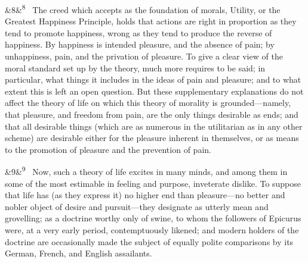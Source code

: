 \documentclass[12pt]{article}
\newcommand{\para}[1][]{\par\noindent\ifx&#1&\else\textsuperscript{\footnotesize #1}~\fi}
\begin{document}
\para[8] The creed which accepts as the foundation of morals, Utility, or the Greatest Happiness Principle, holds that actions are right in proportion as they tend to promote happiness, wrong as they tend to produce the reverse of happiness. By happiness is intended pleasure, and the absence of pain; by unhappiness, pain, and the privation of pleasure. To give a clear view of the moral standard set up by the theory, much more requires to be said; in particular, what things it includes in the ideas of pain and pleasure; and to what extent this is left an open question. But these supplementary explanations do not affect the theory of life on which this theory of morality is grounded---namely, that pleasure, and freedom from pain, are the only things desirable as ends; and that all desirable things (which are as numerous in the utilitarian as in any other scheme) are desirable either for the pleasure inherent in themselves, or as means to the promotion of pleasure and the prevention of pain.

\para[9] Now, such a theory of life excites in many minds, and among them in some of the most estimable in feeling and purpose, inveterate dislike. To suppose that life has (as they express it) no higher end than pleasure---no better and nobler object of desire and pursuit---they designate as utterly mean and grovelling; as a doctrine worthy only of swine, to whom the followers of Epicurus were, at a very early period, contemptuously likened; and modern holders of the doctrine are occasionally made the subject of equally polite comparisons by its German, French, and English assailants.
\end{document}
